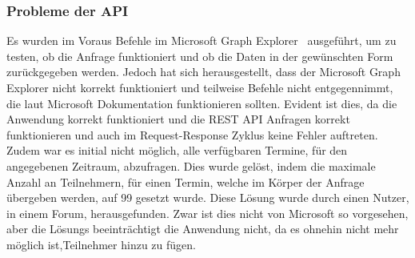 \subsubsection{Probleme der API}\label{subsubsec:probleme-der-api}
Es wurden im Voraus Befehle im Microsoft Graph Explorer~\cite{Microsoft-Graph-Explorer} ausgeführt, um zu testen, ob die Anfrage funktioniert und ob die Daten in der gewünschten Form zurückgegeben werden.
Jedoch hat sich herausgestellt, dass der Microsoft Graph Explorer nicht korrekt funktioniert und teilweise Befehle nicht entgegennimmt, die laut Microsoft Dokumentation funktionieren sollten.
Evident ist dies, da die Anwendung korrekt funktioniert und die REST API Anfragen korrekt funktionieren und auch im Request-Response Zyklus keine Fehler auftreten.
\newline
\newline
Zudem war es initial nicht möglich, alle verfügbaren Termine, für den angegebenen Zeitraum, abzufragen.
Dies wurde gelöst, indem die maximale Anzahl an Teilnehmern, für einen Termin, welche im Körper der Anfrage übergeben werden, auf 99 gesetzt wurde.
Diese Lösung wurde durch einen Nutzer, in einem Forum, herausgefunden.
Zwar ist dies nicht von Microsoft so vorgesehen, aber die Lösungs beeinträchtigt die Anwendung nicht, da es ohnehin nicht mehr möglich ist,Teilnehmer hinzu zu fügen.
\newline
\newline
